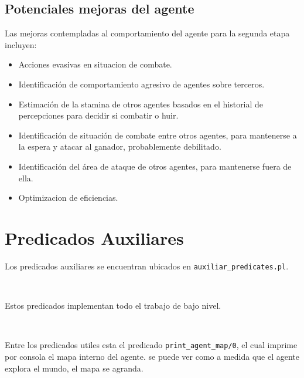 \documentclass[a4paper,12pt]{report}
\begin{document}
\section{Potenciales mejoras del agente}

Las mejoras contempladas al comportamiento del agente para la segunda etapa incluyen:
\begin{itemize}
\item Acciones evasivas en situacion de combate.
\item Identificaci\'{o}n de comportamiento agresivo de agentes sobre terceros.
\item Estimaci\'{o}n de la stamina de otros agentes basados en el historial de percepciones para 
      decidir si combatir o huir.
\item Identificaci\'{o}n de situaci\'{o}n de combate entre otros agentes, para mantenerse a la espera
      y atacar al ganador, probablemente debilitado.
\item Identificaci\'{o}n del \'{a}rea de ataque de otros agentes, para mantenerse fuera de ella. 
\item Optimizacion de eficiencias. 
\end{itemize}

\chapter{Predicados Auxiliares}

Los predicados auxiliares se encuentran ubicados en \texttt{auxiliar\_predicates.pl}.

\ 

Estos predicados implementan todo el trabajo de bajo nivel.

\

Entre los predicados utiles esta el predicado \texttt{print\_agent\_map/0}, el cual imprime por consola
el mapa interno del agente. se puede ver como a medida que el agente explora el mundo, el mapa se agranda.
\end{document}
